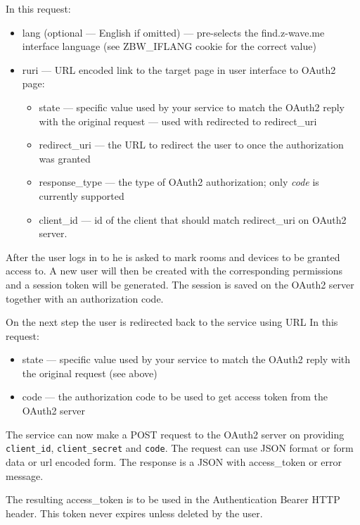 In this request:
\begin{itemize}
\item lang (optional --- English if omitted) — pre-selects the find.z-wave.me interface language (see ZBW\_IFLANG cookie for the correct value)
\item ruri --- URL encoded link to the target page in \zway user interface to OAuth2 page:
\begin{itemize}
	\item state --- specific value used by your service to match the OAuth2 reply with the original request --- used with redirected to redirect\_uri
	\item redirect\_uri --- the URL to redirect the user to once the authorization was granted
	\item response\_type --- the type of OAuth2 authorization; only \textit{code} is currently supported
	\item client\_id --- id of the client that should match redirect\_uri on \zwaveme OAuth2 server.
\end{itemize}
\end{itemize}

After the user logs in to \zway he is asked to mark rooms and devices to be granted access to.
A new user will then be created with the corresponding permissions and a session token will be generated.
The session is saved on the \zwaveme OAuth2 server together with an authorization code.

On the next step the user is redirected back to the service using URL 
In this request:
\begin{itemize}
\item state --- specific value used by your service to match the OAuth2 reply with the original request (see above)
\item code --- the authorization code to be used to get access token from the OAuth2 server
\end{itemize}

The service can now make a POST request to the \zwaveme OAuth2 server on  providing \texttt{client\_id}, \texttt{client\_secret} and \texttt{code}.
The request can use JSON format or form data or url encoded form. The response is a JSON with access\_token or error message.

The resulting access\_token is to be used in the Authentication Bearer HTTP header.
This token never expires unless deleted by the user.

